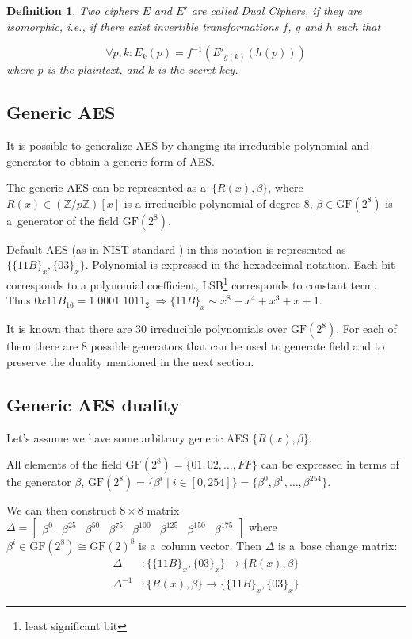 \documentclass[11pt,oneside,final]{fithesis2}
\newtheorem{mydef}{Definition}
\newcommand{\gfe}{\ensuremath{\text{GF}\left(2^8\right)}}
\begin{document}
	\begin{mydef}\label{def:dual_cipher}
	Two ciphers $E$ and $E'$ are called Dual Ciphers, if they are
	isomorphic, i.e., if there exist invertible transformations $f$, $g$ and $h$ such
	that

	\begin{equation} 
	\forall p, k: E_k(p) = f^{-1}\left(E'_{g(k)}(h(p))\right)
	\end{equation}
	where $p$ is the plaintext, and $k$ is the secret key.
	\end{mydef}

	\subsection{Generic AES}\label{sec:genericAES}
	It is possible to generalize AES by changing its irreducible polynomial and generator to obtain a generic form of AES.

	The generic AES can be represented as a~$\{R(x), \beta \}$, where $R(x) \in \left(\mathbb{Z}/p\mathbb{Z}\right)[x]$ is 
	a irreducible polynomial of degree 8, $\beta \in \gfe$ is a~generator of the field $\gfe$.

	Default AES (as in NIST standard \citep{AES-FIPS}) in this notation is represented as $\{\{11B\}_x, \{03\}_x\}$. Polynomial is expressed
	in the hexadecimal notation. Each bit corresponds to a polynomial coefficient, LSB\footnote{least significant bit} corresponds to constant term.\\
	Thus $0x11B_{16} = 1 \; 0001 \; 1011_{2} \; \Rightarrow \{11B\}_x \sim x^8+x^4+x^3+x+1$.

	It is known that there are $30$ irreducible polynomials over $\gfe$. For each of them there are $8$ possible
	generators that can be used to generate field and to preserve the duality mentioned in the next section.

	\subsection{Generic AES duality}
	Let's assume we have some arbitrary generic AES $\{R(x), \beta \}$. 

	All elements of the field $\gfe = \{01, 02, \dots, FF\}$
	can be expressed in terms of the generator $\beta$, $\gfe = \{\beta^i \; | \; i \in [0,254]\} = \{\beta^0, \beta^1, \dots, \beta^{254}\}$.

	We can then construct $8 \times 8$ matrix $\Delta = \begin{bmatrix} \beta^0 & \beta^{25} & \beta^{50} & \beta^{75} & \beta^{100} & \beta^{125} & \beta^{150} & \beta^{175}  \end{bmatrix}$ where 
	$\beta^i \in \gfe \cong \text{GF}(2)^8$ is a~column vector. Then $\Delta$ is a~base change matrix:
	\begin{subequations}
	\begin{align}
	    \Delta &: \{\{11B\}_x, \{03\}_x\}  \longrightarrow \{R(x), \beta \} \\
	    \Delta^{-1} &: \{R(x), \beta \}  \longrightarrow \{\{11B\}_x, \{03\}_x\}
	\end{align}
	\end{subequations}
\end{document}
